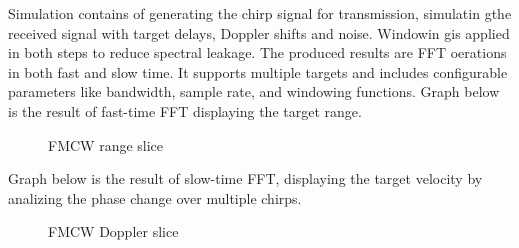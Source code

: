 \documentclass[conference]{IEEEtran}
\begin{document}
Simulation contains of generating the chirp signal for transmission, simulatin gthe received signal with target delays, Doppler shifts and noise. Windowin gis applied in both steps to reduce spectral leakage. The produced results are  FFT oerations in both fast and slow time. It supports multiple targets and includes configurable parameters like bandwidth, sample rate, and windowing functions. Graph below is the result of fast-time FFT displaying the target range.

	\begin{figure}[H]
	    		\centering
	    		\caption{FMCW range slice}
		\end{figure}

Graph below is the result of slow-time FFT, displaying the target velocity by analizing the phase change over multiple chirps. 

	\begin{figure}[H]
	    		\centering
	    		\caption{FMCW Doppler slice}
		\end{figure}
	
\end{document}
